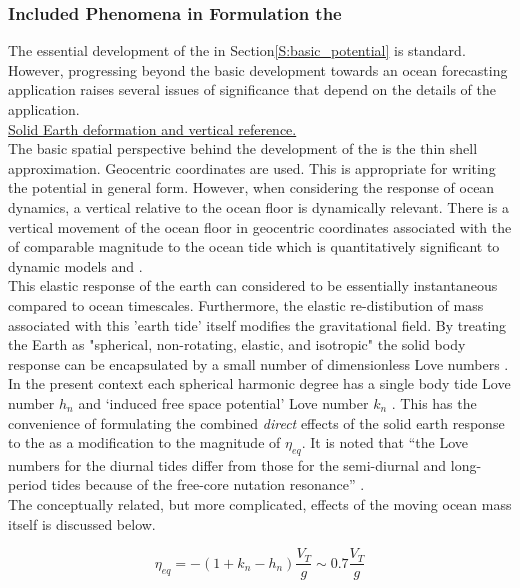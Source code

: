 \subsubsection{Included Phenomena in Formulation the \ATGP{}}
\label{S:ATGP_extras}
The essential development of the \ATGP{} in Section\ref{S:basic_potential} is standard.  However, progressing beyond the basic development towards an ocean forecasting application raises several issues of significance that depend on the details of the application.\\


\underline{Solid Earth deformation and vertical reference.}  \\
The basic spatial perspective behind the development of the \ATGP{} is the thin shell approximation.  Geocentric coordinates are used.  This is appropriate for writing the potential in general form.  However, when considering the response of ocean dynamics, a vertical relative to the ocean floor is dynamically relevant.  There is a vertical movement of the ocean floor in geocentric coordinates associated with the \ATGP{} of comparable magnitude to the ocean tide which is quantitatively significant to dynamic models \citep{Hendershott:1981ub} and \citep[pp.336]{gill1982atmosphere}.\\
This elastic response of the earth can considered to be essentially instantaneous compared to ocean timescales.  Furthermore, the elastic re-distibution of mass associated with this 'earth tide' itself modifies the gravitational field.    By treating the Earth as "spherical, non-rotating, elastic, and isotropic" the solid body response can be encapsulated by a small number of dimensionless Love numbers \citep{Agnew:2011ub}.  In the present context each spherical harmonic degree has a single body tide Love number $h_n$ and `induced free space potential' Love number $k_n$ \citep[Sec 5.3.3]{Urban:2013vl}. This has the convenience of formulating the combined \emph{direct} effects of the solid earth response to the \ATGP{} as a modification to the magnitude of $\eta_{eq}$.  It is noted that ``the Love numbers for the diurnal tides differ from those for the semi-diurnal and long-period tides because of the free-core nutation resonance'' \citep{Arbic:2004wz}.\\
The conceptually related, but more complicated, effects of the moving ocean mass itself is discussed below.

\begin{equation}
\eta_{eq} = -(1+k_n-h_n) \frac{V_T}{g} \sim 0.7 \frac{V_T}{g}
\end{equation} 



